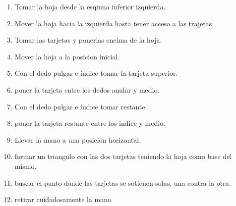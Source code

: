 \documentclass{article}
\begin{document}
\begin{enumerate}[1.]
    \item Tomar la hoja desde la esqiuna inferior izquierda.
    \item Mover la hoja hacia la izquierda hasta tener acceso a las trajetas.
    \item Tomar las tarjetas y ponerlas encima de la hoja.
    \item Mover la hoja a la posicion inicial.
    \item Con el dedo pulgar e índice tomar la tarjeta superior.
    \item poner la tarjeta entre los dedos anular y medio.
    \item Con el dedo pulgar e índice tomar restante.
    \item poner la tarjeta restante entre los indice y medio.
    \item Llevar la mano a una posición horizontal.
    \item formar un triangulo con las dos tarjetas teniendo la hoja como base del mismo.
    \item buscar el punto donde las tarjetas se sotienen solas, una contra la otra.
    \item retirar cuidadosamente la mano 

\end{enumerate}
\end{document}
